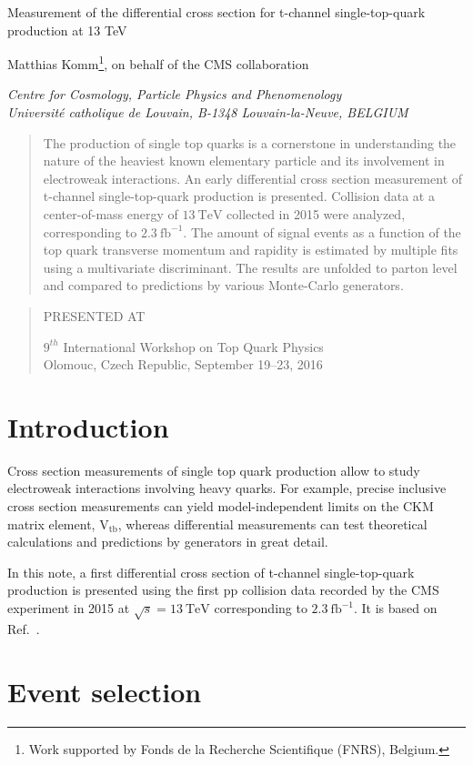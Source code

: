 \documentclass[12pt]{article}
\newcommand\pubnumber{}%
\newcommand\pubdate{\today}
\def\institute{Centre for Cosmology, Particle Physics and Phenomenology\\
Universit\'e catholique de Louvain, B-1348 Louvain-la-Neuve, BELGIUM}
\def\support{\footnote{Work supported by Fonds de la Recherche Scientifique (FNRS), Belgium.}}
\def\Title#1{\begin{center} {\Large #1 } \end{center}}
\def\Author#1{\begin{center}{ \sc #1} \end{center}}
\def\Address#1{\begin{center}{ \it #1} \end{center}}
\newcommand\pubblock{\rightline{\begin{tabular}{l} \pubnumber\\
         \pubdate  \end{tabular}}}
\newenvironment{Abstract}{\begin{quotation}  }{\end{quotation}}
\newenvironment{Presented}{\begin{quotation} \begin{center} 
             PRESENTED AT\end{center}\bigskip 
      \begin{center}\begin{large}}{\end{large}\end{center} \end{quotation}}
\begin{document}
\begin{titlepage}
\pubblock

\vfill
\Title{Measurement of the differential cross section for t-channel single-top-quark production at 13 TeV}
\vfill
\Author{ Matthias Komm\support, on behalf of the CMS collaboration}
\Address{\institute}
\vfill
\begin{Abstract}
The production of single top quarks is a cornerstone in understanding the nature of the heaviest known elementary particle and its involvement in electroweak interactions. An early differential cross section measurement of t-channel single-top-quark production is presented. Collision data at a center-of-mass energy of $13~\mathrm{TeV}$ collected in 2015 were analyzed, corresponding to $2.3~\mathrm{fb}^{-1}$. The amount of signal events as a function of the top quark transverse momentum and rapidity is estimated by multiple fits using a multivariate discriminant. The results are unfolded to parton level and compared to predictions by various Monte-Carlo generators.
\end{Abstract}
\vfill
\begin{Presented}
$9^{th}$ International Workshop on Top Quark Physics\\
Olomouc, Czech Republic,  September 19--23, 2016
\end{Presented}
\vfill
\end{titlepage}
\def\thefootnote{\fnsymbol{footnote}}
\setcounter{footnote}{0}
%

\section{Introduction}

Cross section measurements of single top quark production allow to study electroweak interactions involving heavy quarks. For example, precise inclusive cross section measurements can yield model-independent limits on the CKM matrix element, $\mathrm{V}_\mathrm{tb}$, whereas differential measurements can test theoretical calculations and predictions by generators in great detail.

In this note, a first differential cross section of t-channel single-top-quark production is presented using the first pp collision data recorded by the CMS experiment in 2015 at $\sqrt{s}=13~\mathrm{TeV}$ corresponding to $2.3~\mathrm{fb}^{-1}$. It is based on Ref.~\cite{TOP-16-004}.

\section{Event selection}
\end{document}
